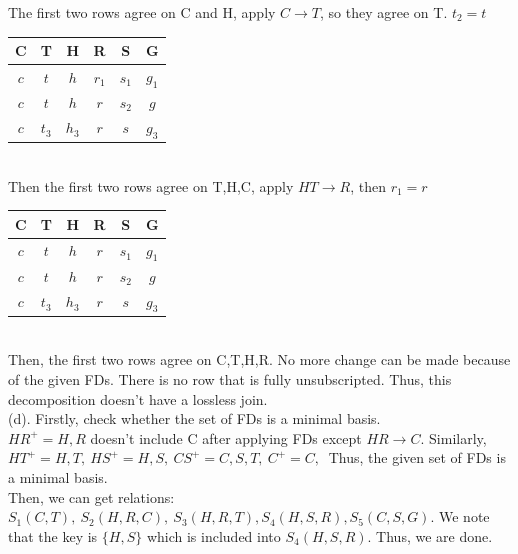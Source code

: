 \documentclass[12pt]{article}
\begin{document}
The first two rows agree on C and H, apply $C\rightarrow T$, so they agree on T. $t_{2}=t$\\

\begin{tabular}{|c|c|c|c|c|c|}
\hline
C & T & H & R & S & G \\
\hline
$c$ & $t$ & $h$ & $r_{1}$ & $s_{1}$ & $g_{1}$ \\
\hline
$c$ & $t$ & $h$ & $r$ & $s_{2}$ & $g$\\
\hline
$c$ & $t_{3}$ & $h_{3}$ & $r$ & $s$ & $g_{3}$\\
\hline
\end{tabular}\\

Then the first two rows agree on T,H,C, apply $HT\rightarrow R$, then $r_{1}=r$\\

\begin{tabular}{|c|c|c|c|c|c|}
\hline
C & T & H & R & S & G \\
\hline
$c$ & $t$ & $h$ & $r$ & $s_{1}$ & $g_{1}$ \\
\hline
$c$ & $t$ & $h$ & $r$ & $s_{2}$ & $g$\\
\hline
$c$ & $t_{3}$ & $h_{3}$ & $r$ & $s$ & $g_{3}$\\
\hline
\end{tabular}\\

Then, the first two rows agree on C,T,H,R. No more change can be made because of the given FDs. There is no row that is fully unsubscripted. Thus, this decomposition doesn't have a lossless join.\\

(d). Firstly, check whether the set of FDs is a minimal basis.\\
$HR^{+} = {H,R}$ doesn't include C after applying FDs except $HR\rightarrow C$. Similarly, $HT^{+} = {H,T},\ HS^{+} = {H,S},\ CS^{+} = {C, S, T},\ C^{+} = {C},\ $ Thus, the given set of FDs is a minimal basis.\\
Then, we can get relations: $S_{1}(C,T),\ S_{2}(H,R,C),\ S_{3}(H,R,T), S_{4}(H,S,R), S_{5}(C,S,G)$. We note that the key is $\{H,S\}$ which is included into $S_{4}(H,S,R)$. Thus, we are done.\\
\end{document}
